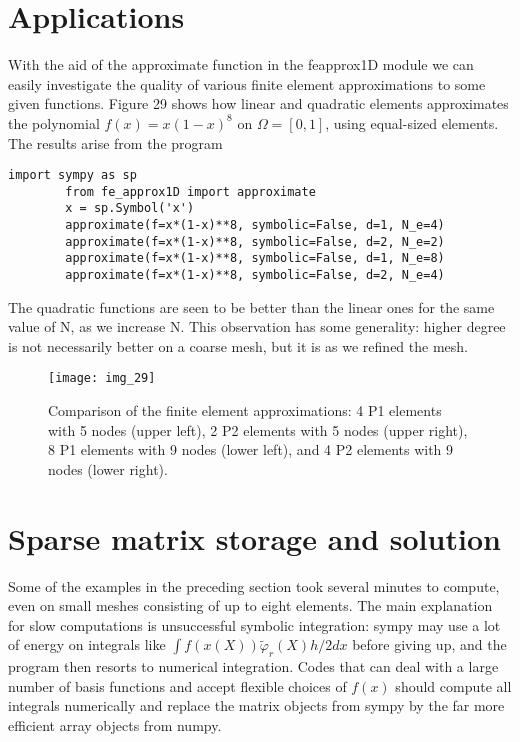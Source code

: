 \documentclass[../main.tex]{subfiles}
\begin{document}
	\section[Applications]{Applications}
	\label{sec:sec_4_7}
	\noindent With the aid of the approximate function in the fe\textunderscore approx1D module we can easily investigate the quality of various finite element approximations to some given functions. Figure 29 shows how linear and quadratic elements approximates the polynomial $f(x)=x(1-x)^{8}$ on $\Omega=[0,1]$, using equal-sized elements. The results arise from the program
	\begin{lstlisting}[numbers=none]
		import sympy as sp
		from fe_approx1D import approximate
		x = sp.Symbol('x')
		approximate(f=x*(1-x)**8, symbolic=False, d=1, N_e=4)
		approximate(f=x*(1-x)**8, symbolic=False, d=2, N_e=2)
		approximate(f=x*(1-x)**8, symbolic=False, d=1, N_e=8)
		approximate(f=x*(1-x)**8, symbolic=False, d=2, N_e=4)	
	\end{lstlisting}
	The quadratic functions are seen to be better than the linear ones for the same
	value of N, as we increase N. This observation has some generality: higher
	degree is not necessarily better on a coarse mesh, but it is as we refined the
	mesh.
	\begin{figure}[H]
		\centering
		\texttt{[image: img\_29]}
		\caption{Comparison of the finite element approximations: 4 P1 elements with
			5 nodes (upper left), 2 P2 elements with 5 nodes (upper right), 8 P1 elements
			with 9 nodes (lower left), and 4 P2 elements with 9 nodes (lower right).}
		\label{fig:img_29}
	\end{figure}
	\section[Sparse matrix storage and solution]{Sparse matrix storage and solution}
	\label{sec:sec_4_8}
	\noindent Some of the examples in the preceding section took several minutes to compute, even on small meshes consisting of up to eight elements. The main explanation for slow computations is unsuccessful symbolic integration: sympy may use a lot of energy on integrals like $\int f(x(X)) \tilde{\varphi}_{r}(X) h / 2 d x$ before giving up, and the program then resorts to numerical integration. Codes that can deal with a large number of basis functions and accept flexible choices of $f(x)$ should compute all integrals numerically and replace the matrix objects from sympy by the far more efficient array objects from numpy.
	
\end{document}
